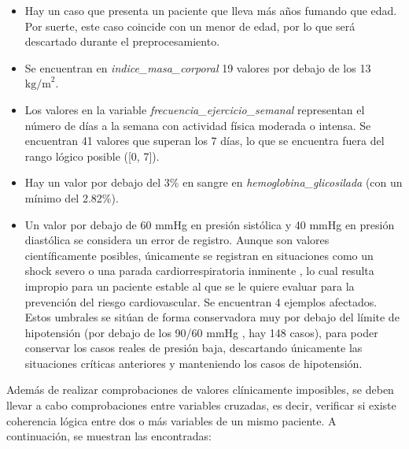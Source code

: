 \documentclass[journal,onecolumn]{IEEEtran}
\begin{document}
\begin{itemize}
    \item Hay un caso que presenta un paciente que lleva más años fumando que edad. Por suerte, este caso coincide con un menor de edad, por lo que será descartado durante el preprocesamiento. 

    \item Se encuentran en \textit{indice\_masa\_corporal} 19 valores por debajo de los 13 $\text{kg/m}^2$.

    \item Los valores en la variable \textit{frecuencia\_ejercicio\_semanal} representan el número de días a la semana con actividad física moderada o intensa. Se encuentran 41 valores que superan los 7 días, lo que se encuentra fuera del rango lógico posible ([0, 7]).

    \item Hay un valor por debajo del 3\% en sangre en \textit{hemoglobina\_glicosilada} (con un mínimo del 2.82\%).

    \item Un valor por debajo de 60 mmHg en presión sistólica y 40 mmHg en presión diastólica se considera un error de registro. Aunque son valores científicamente posibles, únicamente se registran en situaciones como un shock severo o una parada cardiorrespiratoria inminente \cite{evans2021sepsis}, lo cual resulta impropio para un paciente estable al que se le quiere evaluar para la prevención del riesgo cardiovascular. Se encuentran 4 ejemplos afectados. Estos umbrales se sitúan de forma conservadora muy por debajo del límite de hipotensión (por debajo de los 90/60 mmHg \cite{nhlbi_hipotension,medlineplus_hipotension}, hay 148 casos), para poder conservar los casos reales de presión baja, descartando únicamente las situaciones críticas anteriores y manteniendo los casos de hipotensión.
 
\end{itemize}

Además de realizar comprobaciones de valores clínicamente imposibles, se deben llevar a cabo comprobaciones entre variables cruzadas, es decir, verificar si existe coherencia lógica entre dos o más variables de un mismo paciente. A continuación, se muestran las encontradas:
\end{document}
